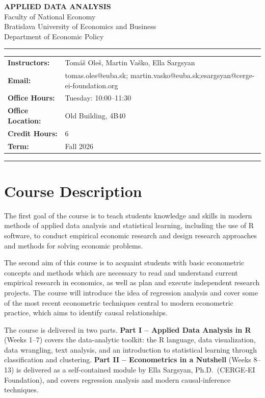 \documentclass[11pt]{article}
\newcommand{\hdivider}{\noindent\rule{\textwidth}{0.8pt}}
\begin{document}
\begin{center}
{\LARGE\bfseries\color{oxfordblue} APPLIED DATA ANALYSIS}\\[2pt]
{\large Faculty of National Economy}\\[1pt]
{\large Bratislava University of Economics and Business}\\[1pt]
{\large Department of Economic Policy}
\end{center}

\hdivider
\smallskip

\noindent
\begin{tabular}{@{}>{\bfseries}p{3.1cm}p{12.9cm}@{}}
Instructors: & Tomáš Oleš, Martin Vaško, Ella Sargsyan \\
Email: & tomas.oles@euba.sk; martin.vasko@euba.sk;\newline esargsyan@cerge-ei-foundation.org \\
Office Hours: & Tuesday: 10:00--11:30 \\
Office Location: & Old Building, 4B40 \\
Credit Hours: & 6 \\
Term: & Fall 2026 \\
\end{tabular}

\smallskip
\hdivider

\section{Course Description}

The first goal of the course is to teach students knowledge and skills in modern methods of applied data
analysis and statistical learning, including the use of R software, to conduct empirical economic research
and design research approaches and methods for solving economic problems.

The second aim of this course is to acquaint students with basic econometric concepts and methods which
are necessary to read and understand current empirical research in economics, as well as plan and execute
independent research projects. The course will introduce the idea of regression analysis and cover some of
the most recent econometric techniques central to modern econometric practice, which aims to identify
causal relationships.

The course is delivered in two parts. \textbf{Part I -- Applied Data Analysis in R} (Weeks 1--7) covers the
data-analytic toolkit: the R language, data visualization, data wrangling, text analysis, and an
introduction to statistical learning through classification and clustering. \textbf{Part II -- Econometrics
in a Nutshell} (Weeks 8--13) is delivered as a self-contained module by Ella Sargsyan, Ph.D.\
(CERGE-EI Foundation), and covers regression analysis and modern causal-inference techniques.
\end{document}
